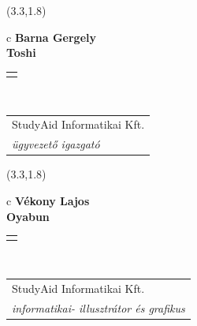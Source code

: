 \documentclass[11pt]{article}
\begin{document}
\makebox(3.3,1.8){
  \renewcommand\arraystretch{1.3}
  \begin{tabular}[c]{c}
    \hspace{8.5mm}
    \LARGE\bf{ Barna Gergely }\\
    \hspace{8.5mm}
    \Large{ Toshi }\\
    \renewcommand\arraystretch{3}
    \begin{tabular}[c]{c}
      \centering
      \fontfamily{phv}\selectfont{
        \textbf{
          \textsc{
            \scriptsize{
            \color{Dark}{ Ismerkedő }\color{Bright}{ Webmester }\color{Bright}{ Sminkmester }\color{Bright}{ Programozó }
            }
          }
        }
      }
    \end{tabular}
    \\
    \renewcommand\arraystretch{1}
    \begin{tabular}{p{3.3in}}
      \hspace{.7cm}StudyAid Informatikai Kft.\\
      \hspace{.7cm}\emph{ ügyvezető igazgató }\\
    \end{tabular}
  \end{tabular}
}

\makebox(3.3,1.8){
  \renewcommand\arraystretch{1.3}
  \begin{tabular}[c]{c}
    \hspace{8.5mm}
    \LARGE\bf{ Vékony Lajos }\\
    \hspace{8.5mm}
    \Large{ Oyabun }\\
    \renewcommand\arraystretch{3}
    \begin{tabular}[c]{c}
      \centering
      \fontfamily{phv}\selectfont{
        \textbf{
          \textsc{
            \scriptsize{
            \color{Dark}{ Ismerkedő }\color{Bright}{ Webmester }\color{Bright}{ Sminkmester }\color{Bright}{ Programozó }
            }
          }
        }
      }
    \end{tabular}
    \\
    \renewcommand\arraystretch{1}
    \begin{tabular}{p{3.3in}}
      \hspace{.7cm}StudyAid Informatikai Kft.\\
      \hspace{.7cm}\emph{ informatikai- illusztrátor és grafikus }\\
    \end{tabular}
  \end{tabular}
}
\end{document}
